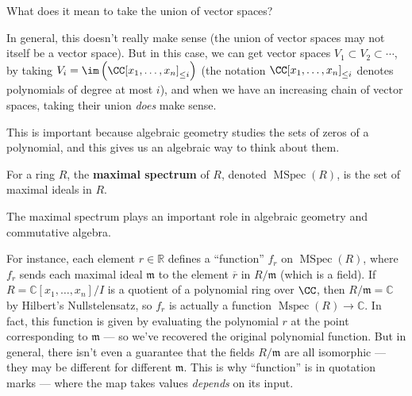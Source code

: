 \begin{question}
What does it mean to take the union of vector spaces?
\end{question}

\begin{ans}
In general, this doesn't really make sense (the union of vector spaces may not itself be a vector space). But in this case, we can get vector spaces $V_1 \subset V_2 \subset \cdots$, by taking $V_i = \im\left(\CC[x_1, \ldots, x_n]_{\leq i}\right)$ (the notation $\CC[x_1, \ldots, x_n]_{\leq i}$ denotes polynomials of degree at most $i$), and when we have an increasing chain of vector spaces, taking their union \emph{does} make sense. 
\end{ans}

This is important because algebraic geometry studies the sets of zeros of a polynomial, and this gives us an algebraic way to think about them. 


\begin{definition}
For a ring $R$, the \textbf{maximal spectrum} of $R$, denoted $\operatorname{MSpec}(R)$, is the set of maximal ideals in $R$. 
\end{definition}

The maximal spectrum plays an important role in algebraic geometry and commutative algebra. 

For instance, each element $r \in \mathbb{R}$ defines a ``function'' $f_r$ on $\operatorname{MSpec}(R)$, where $f_r$ sends each maximal ideal $\mathfrak{m}$ to the element $\overline{r}$ in $R/\mathfrak{m}$ (which is a field). If $R = \mathbb{C}[x_1, \ldots, x_n]/I$ is a quotient of a polynomial ring over $\CC$, then $R/\mathfrak{m} = \mathbb{C}$ by Hilbert's Nullstelensatz, so $f_r$ is actually a function $\operatorname{Mspec}(R) \to \mathbb{C}$. In fact, this function is given by evaluating the polynomial $r$ at the point corresponding to $\mathfrak{m}$ --- so we've recovered the original polynomial function. But in general, there isn't even a guarantee that the fields $R/\mathfrak{m}$ are all isomorphic --- they may be different for different $\mathfrak{m}$. This is why ``function'' is in quotation marks --- where the map takes values \emph{depends} on its input. 



